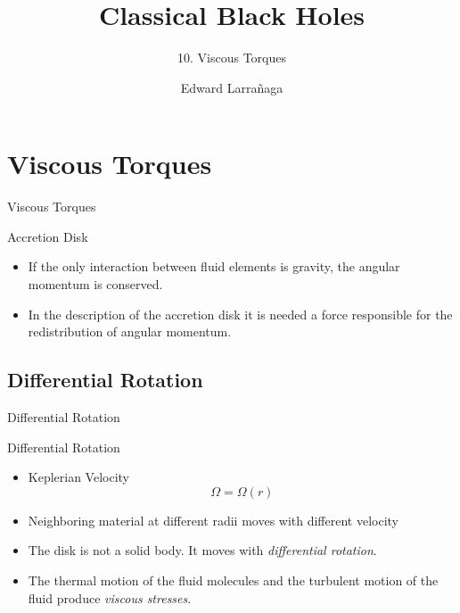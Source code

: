 \documentclass{beamer}
\title{Classical Black Holes} %
\subtitle{10. Viscous Torques  } %
\author{Edward Larra\~{n}aga}
\begin{document}
\frame{\maketitle}



\section{Viscous Torques}
\begin{frame}
\Huge
Viscous Torques
\end{frame}

\begin{frame}{Accretion Disk}
	\begin{itemize}
	\item If the only interaction between fluid elements is gravity, the angular momentum is conserved.
	\pause
	\item In the description of the accretion disk it is needed a force responsible for the redistribution of angular momentum.
	\end{itemize}
\end{frame}

\subsection{Differential Rotation}
\begin{frame}
\Huge
Differential Rotation
\end{frame}

\begin{frame}{Differential Rotation}
	\begin{itemize}
	\item Keplerian Velocity
	\[ \Omega = \Omega (r)\]
	\pause
	\item Neighboring material at different radii moves with different velocity
	\pause
	\item The disk is not a solid body. It moves with \textit{differential rotation}.
	\pause
	\item The thermal motion of the fluid molecules and the turbulent motion of the fluid produce \textit{viscous stresses}.
	\end{itemize}
\end{frame}
\end{document}
